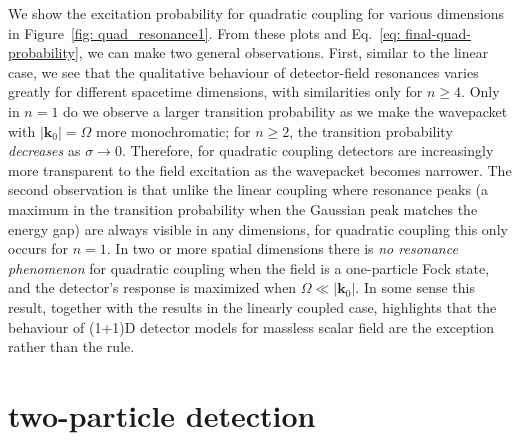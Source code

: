 \documentclass[11pt,prd,onecolumn,superscriptaddress,nofootinbib,floatfix,amsmath,amssymb]{revtex4-2}
\newcommand{\bk}{{\bm{k}}}
\begin{document}
    We show the excitation probability for quadratic coupling for various dimensions in Figure~\ref{fig: quad_resonance1}. From these plots and  Eq.~\eqref{eq: final-quad-probability}, we can make two general observations. First, similar to the linear case, we see that the qualitative behaviour of detector-field resonances varies greatly for different spacetime dimensions, with similarities only for $n\geq 4$. Only in $n=1$ do we observe a larger transition probability as we make the wavepacket with $|\bm k_0|=\Omega$ more monochromatic; for $n\geq 2$, the transition probability \textit{decreases} as $\sigma\to 0$. Therefore, for quadratic coupling detectors are increasingly more transparent to the field excitation as the wavepacket becomes narrower. The second observation is that unlike the linear coupling where resonance peaks (a maximum in the transition probability when the Gaussian peak matches the energy gap) are always visible in any dimensions, for quadratic coupling this only occurs for $n=1$. In two or more spatial dimensions there is \textit{no resonance phenomenon} for quadratic coupling when the field is a one-particle Fock state, and the detector's response is maximized when $\Omega\ll |\bk_0|$. In some sense this result, together with the results in the linearly coupled case, highlights that the behaviour of (1+1)D detector models for massless scalar field are the exception rather than the rule.
    	
       
    
    
    
    
    
    
    
    
    
    
    
    
    
    
    
    

















    \section{two-particle detection}
    \label{sec:twoparticle}
    
\end{document}
